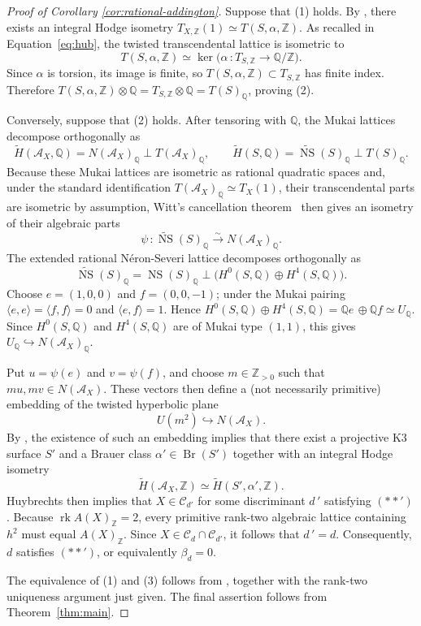 \documentclass[10pt]{amsart}
\numberwithin{equation}{section}
\theoremstyle{definition}
\theoremstyle{plain}
\numberwithin{theorem}{section}
\newcommand{\Q}{\mathbb{Q}}
\newcommand{\Z}{\mathbb{Z}}
\newcommand{\NS}{\operatorname{NS}}
\begin{document}
\begin{proof}[Proof of Corollary \textup{\ref{cor:rational-addington}}]
Suppose that (1) holds. By
\cite[Theorem~1.3 and Equation~1.1]{Huybrechts2015TheKC}, there exists an integral Hodge isometry $T_{X,\Z}(1)\simeq T(S,\alpha, \Z)$. As recalled in Equation~\ref{eq:hub}, the twisted transcendental lattice is isometric to
$$
T(S,\alpha,\Z)
\simeq
\ker\bigl(\alpha\,\colon T_{S,\Z}\longrightarrow\Q/\Z\bigr).
$$
Since $\alpha$ is torsion, its image is finite, so $T(S,\alpha,\Z)\subset T_{S,\Z}$ has finite index. Therefore $T(S,\alpha,\Z)\otimes \Q =T_{S,\Z} \otimes \Q = T(S)_\Q$, proving (2). 

Conversely, suppose that (2) holds. After tensoring with $\Q$, the Mukai lattices decompose orthogonally as
$$
\widetilde{H}(\mathcal{A}_X, \Q) = N(\mathcal{A}_X)_{\Q} \perp T(\mathcal{A}_X)_{\Q}, \qquad 
\widetilde{H}(S, \Q) = \widetilde{\NS}(S)_{\Q} \perp T(S)_{\Q}.
$$ Because these Mukai lattices are isometric as rational quadratic spaces and, under the standard identification $T(\mathcal A_X)_\Q\simeq T_X(1)$, their transcendental parts are isometric by assumption, Witt's cancellation theorem~\cite[Theorem~2.1]{chebolu2016wittscancellationtheoremseen} then gives an isometry of their algebraic parts 
$$\psi\,\colon \widetilde{\NS}(S)_{\Q} \xrightarrow{\sim} N(\mathcal{A}_X)_{\Q}.$$
The extended rational Néron-Severi lattice decomposes orthogonally as
$$
\widetilde{\NS}(S)_{\Q} = \NS(S)_{\Q} \perp \bigl(H^0(S,\Q) \oplus H^4(S,\Q)\bigr).
$$
Choose $e=(1,0,0)$ and $f=(0,0,-1)$; under the Mukai pairing $\langle e,e\rangle=\langle f,f\rangle=0$ and $\langle e,f\rangle=1$. Hence $H^0(S,\Q) \oplus H^4(S,\Q)=\Q e \, \oplus \Q f \simeq U_\Q$. Since $H^0(S,\Q)$ and $H^4(S,\Q)$ are of Mukai type $(1,1)$,  this gives $U_\Q\hookrightarrow N(\mathcal A_X)_\Q$. 

Put $u=\psi(e)$ and $v=\psi(f)$, and choose $m\in\Z_{>0}$ such that $mu,mv\in N(\mathcal A_X)$. These vectors then define a (not necessarily primitive) embedding of the twisted hyperbolic plane
$$U(m^2) \hookrightarrow N(\mathcal{A}_X).$$
By \cite[Lemma~2.6(ii) and Proposition~2.17]{Huybrechts2015TheKC}, the existence of such
an embedding implies that there exist a
projective K3 surface $S'$ and a Brauer class
$\alpha'\in\operatorname{Br}(S')$ together with an integral Hodge
isometry
$$
\widetilde H(\mathcal A_X,\mathbb Z)
 \simeq
\widetilde H(S',\alpha',\mathbb Z).
$$
Huybrechts \cite[Theorem~1.3]{Huybrechts2015TheKC} then implies that
$X\in\mathcal C_{d'}$ for some discriminant $d\,'$ satisfying $(**')$. Because
$\operatorname{rk}A(X)_{\mathbb Z}=2$, every primitive rank-two
algebraic lattice containing $h^2$ must equal $A(X)_{\mathbb Z}$.
Since $X\in\mathcal C_d\cap\mathcal C_{d'}$, it follows that
$d\,'=d$. Consequently, $d$ satisfies $(**')$, or equivalently
$\beta_d=0$.

The equivalence of (1) and (3) follows from
\cite[Proposition~4.1]{Huybrechts2015TheKC}, together with the
rank-two uniqueness argument just given. The final assertion follows from Theorem~\ref{thm:main}.
\end{proof}
\end{document}
